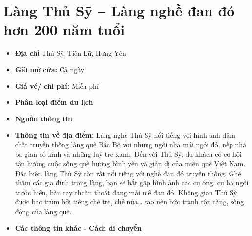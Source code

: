 \documentclass{article}
\begin{document}
\section{Làng Thủ Sỹ – Làng nghề đan đó hơn 200 năm tuổi}
\begin{itemize}
    \item{\textbf{Địa chỉ}} Thủ Sỹ, Tiên Lữ, Hưng Yên

    \item{\textbf{Giờ mở cửa:}} Cả ngày

    \item{\textbf{Giá vé/ chi phí:}} Miễn phí

    \item{\textbf{Phân loại điểm du lịch}}

    \item{\textbf{Nguồn thông tin}}

    \item{\textbf{Thông tin về địa điểm:}} Làng nghề Thủ Sỹ nổi tiếng với hình ảnh đậm chất truyền thống làng quê Bắc Bộ với những ngôi nhà mái ngói đỏ, nếp nhà ba gian cổ kính và những luỹ tre xanh. Đến với Thủ Sỹ, du khách có cơ hội tận hưởng cuộc sống quê hương bình yên và giản dị của miền quê Việt Nam. Đặc biệt, làng Thủ Sỹ còn rất nổi tiếng với nghề đan đó truyền thống. Ghé thăm các gia đình trong làng, bạn sẽ bắt gặp hình ảnh các cụ ông, cụ bà ngồi trước hiên, bàn tay thoăn thoắt đang mải mê đan đó. Không gian Thủ Sỹ được bao trùm bởi tiếng chẻ tre, chẻ nứa… tạo nên bức tranh rộn ràng, sống động của làng quê.
\end{itemize}

\begin{itemize}
    \item{\textbf{Các thông tin khác - Cách di chuyển}}
\end{itemize}
\end{document}
